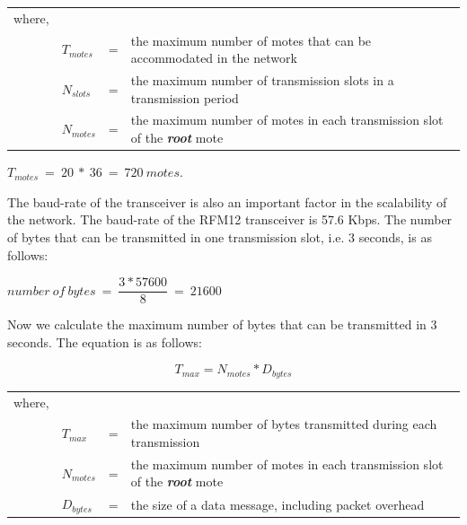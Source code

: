 \begin{tabular}{lllp{10cm}}
where, &   &   &   \\ 
  & $T_{motes}$  & = & the maximum number of motes that can be accommodated in the network \\ 
  & $N_{slots}$ & = & the maximum number of transmission slots in a transmission period \\ 
  & $N_{motes}$ & = & the maximum number of motes in each transmission slot of the \textit{\textbf{root}} mote \\ 
\end{tabular} 

\begin{center}
$T_{motes}\ =\ 20\ *\ 36\ =\ 720\ motes$.
\end{center}

The baud-rate of the transceiver is also an important factor in the scalability of the network. The baud-rate of the RFM12 transceiver is 57.6 Kbps. The number of bytes that can be transmitted in one transmission slot, i.e. 3 seconds, is as follows:
\begin{center}
$number\ of\ bytes\ =\ \dfrac{3*57600}{8}\ =\ 21600$
\end{center}

Now we calculate the maximum number of bytes that can be transmitted in 3 seconds. The equation is as follows: 

\begin{equation}
T_{max} = N_{motes}*D_{bytes}
\end{equation}

\begin{tabular}{lllp{10cm}}
where, &   &   &   \\ 
  & $T_{max}$  & = & the maximum number of bytes transmitted during each transmission \\ 
  & $N_{motes}$ & = & the maximum number of motes in each transmission slot of the \textit{\textbf{root}} mote \\ 
  & $D_{bytes}$ & = & the size of a data message, including packet overhead \\ 
\end{tabular} 

